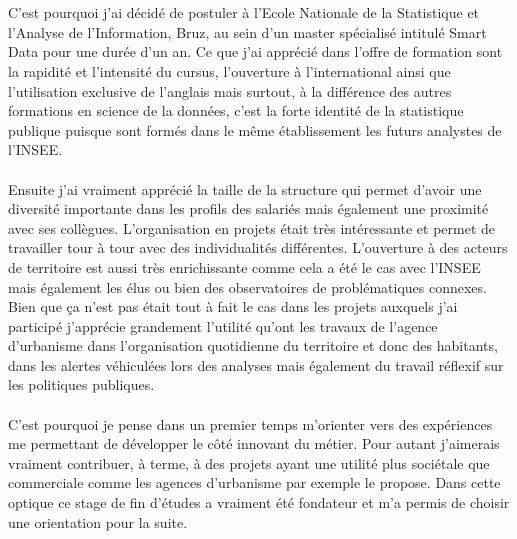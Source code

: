 \documentclass{bredele}
\begin{document}
\\\\C’est pourquoi j’ai décidé de postuler à l’Ecole Nationale de la Statistique et l’Analyse de l’Information, Bruz, au sein d’un master spécialisé intitulé Smart Data pour une durée d’un an. Ce que j’ai apprécié dans l’offre de formation sont la rapidité et l’intensité du cursus, l’ouverture à l’international ainsi que l’utilisation exclusive de l’anglais mais surtout, à la différence des autres formations en science de la données, c’est la forte identité de la statistique publique puisque sont formés dans le même établissement les futurs analystes de l’INSEE.
\\\\Ensuite j’ai vraiment apprécié la taille de la structure qui permet d’avoir une diversité importante dans les profils des salariés mais également une proximité avec ses collègues. L’organisation en projets était très intéressante et permet de travailler tour à tour avec des individualités différentes. L’ouverture à des acteurs de territoire est aussi très enrichissante comme cela a été le cas avec l’INSEE mais également les élus ou bien des observatoires de problématiques connexes. Bien que ça n’est pas était tout à fait le cas dans les projets auxquels j’ai participé j’apprécie grandement l’utilité qu’ont les travaux de l’agence d’urbanisme dans l’organisation quotidienne du territoire et donc des habitants, dans les alertes véhiculées lors des analyses mais également du travail réflexif sur les politiques publiques.
\\\\C’est pourquoi je pense dans un premier temps m’orienter vers des expériences me permettant de développer le côté innovant du métier. Pour autant j’aimerais vraiment contribuer, à terme, à des projets ayant une utilité plus sociétale que commerciale comme les agences d'urbanisme par exemple le propose. Dans cette optique ce stage de fin d'études a vraiment été fondateur et m'a permis de choisir une orientation pour la suite.
\clearemptydoublepage
\backmatter
\clearemptydoublepage
{}
\tableofcontents
\newpage
{}
\listoftables
\newpage
\end{document}
